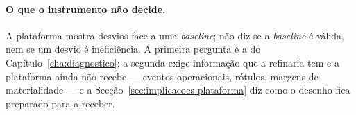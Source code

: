 \paragraph{O que o instrumento não decide.} A plataforma mostra desvios
face a uma \emph{baseline}; não diz se a \emph{baseline} é válida, nem se um
desvio é ineficiência. A primeira pergunta é a do
Capítulo~\ref{cha:diagnostico}; a segunda exige informação que a
refinaria tem e a plataforma ainda não recebe --- eventos operacionais,
rótulos, margens de materialidade --- e a Secção~\ref{sec:implicacoes-plataforma}
diz como o desenho fica preparado para a receber.
